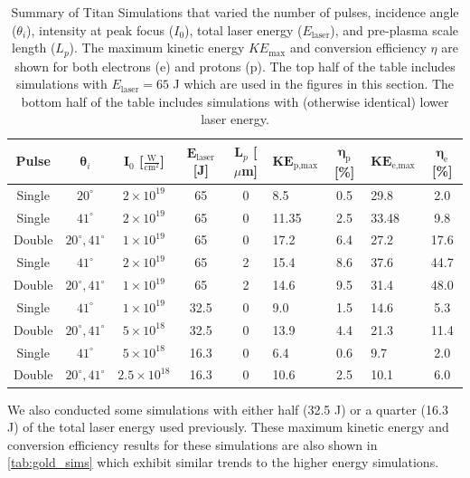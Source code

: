 \renewcommand{\arraystretch}{1.15}
\setlength{\tabcolsep}{0.5em}
\begin{table}
	\centering
	\begin{tabular}{|c|c|c|c|c|p{1.4cm}|c|p{1.4cm}|c|}
		\hline
		\hline
		\textbf{Pulse} & $\pmb{\theta}_i$ & $\mathbf{I}_0$ [$\frac{\text{W}}{\text{cm}^2}$]  & $\mathbf{E}_\text{laser}$ [J] & $\mathbf{L}_p$ [$\mu$m] & $\mathbf{KE}_\text{p,max}$\newline [MeV] & $\pmb{\eta}_\text{p}$ [\%] & $\mathbf{KE}_\text{e,max}$\newline [MeV]& $\pmb{\eta}_{\text{e}}$ [\%] \\
		\hline 
		Single & $20^\circ$ & $2 \times 10^{19}$ & 65 & 0 & 8.5 & 0.5 & 29.8 & 2.0 \\
		\hline
		Single & $41^\circ$ & $2 \times 10^{19}$ & 65 & 0 & 11.35 & 2.5 & 33.48 & 9.8 \\
		Double & $20^\circ, 41^\circ$ & $1 \times 10^{19}$ & 65 & 0 & 17.2 & 6.4 & 27.2 & 17.6 \\
		Single & $41^\circ$ & $2 \times 10^{19}$ & 65 & 2 & 15.4 & 8.6 & 37.6 & 44.7 \\
		Double & $20^\circ, 41^\circ$ & $1 \times 10^{19}$ & 65 & 2 & 14.6 & 9.5 & 31.4 & 48.0 \\
		\hline 
		Single & $41^\circ$ & $1 \times 10^{19}$ & 32.5 & 0 & 9.0 & 1.5 & 14.6 & 5.3 \\
		Double & $20^\circ, 41^\circ$ & $5 \times 10^{18}$ & 32.5 & 0 & 13.9 & 4.4 & 21.3 & 11.4 \\
		Single & $41^\circ$ & $5 \times 10^{18}$ & 16.3 & 0 & 6.4 & 0.6 & 9.7 & 2.0 \\
		Double & $20^\circ, 41^\circ$ & $2.5 \times 10^{18}$ & 16.3 & 0 & 10.6 & 2.5 & 10.1 & 6.0 \\
		\hline
		\hline
	\end{tabular}
	\caption{Summary of Titan Simulations that varied the number of pulses, incidence angle ($\theta_i$), intensity at peak focus ($I_0$), total laser energy ($E_\text{laser}$), and pre-plasma scale length ($L_p$). The maximum kinetic energy $KE_\text{max}$ and conversion efficiency $\eta$ are shown for both electrons (e) and protons (p). The top half of the table includes simulations with $E_\text{laser} = 65$ J which are used in the figures in this section. The bottom half of the table includes simulations with (otherwise identical) lower laser energy.}
	\label{tab:gold_sims}
\end{table}

We also conducted some simulations with either half (32.5 J) or a quarter (16.3 J) of the total laser energy used previously. These maximum kinetic energy and conversion efficiency results for these simulations are also shown in \autoref{tab:gold_sims} which exhibit similar trends to the higher energy simulations.

